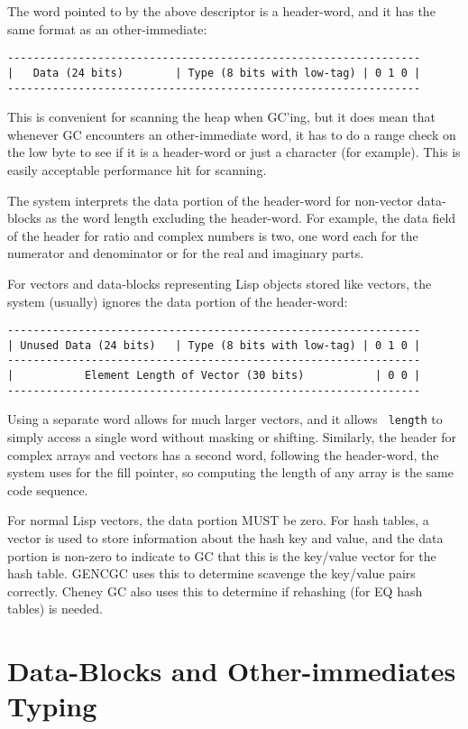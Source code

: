 The word pointed to by the above descriptor is a header-word, and it has the
same format as an other-immediate:
\begin{verbatim}
----------------------------------------------------------------
|   Data (24 bits)        | Type (8 bits with low-tag) | 0 1 0 |
----------------------------------------------------------------
\end{verbatim}
This is convenient for scanning the heap when GC'ing, but it does mean that
whenever GC encounters an other-immediate word, it has to do a range check on
the low byte to see if it is a header-word or just a character (for example).
This is easily acceptable performance hit for scanning.

The system interprets the data portion of the header-word for non-vector
data-blocks as the word length excluding the header-word.  For example, the
data field of the header for ratio and complex numbers is two, one word each
for the numerator and denominator or for the real and imaginary parts.

For vectors and data-blocks representing Lisp objects stored like vectors, the
system (usually) ignores the data portion of the header-word:
\begin{verbatim}
----------------------------------------------------------------
| Unused Data (24 bits)   | Type (8 bits with low-tag) | 0 1 0 |
----------------------------------------------------------------
|           Element Length of Vector (30 bits)           | 0 0 | 
----------------------------------------------------------------
\end{verbatim}

Using a separate word allows for much larger vectors, and it allows {\tt
length} to simply access a single word without masking or shifting.  Similarly,
the header for complex arrays and vectors has a second word, following the
header-word, the system uses for the fill pointer, so computing the length of
any array is the same code sequence.

For normal Lisp vectors, the data portion MUST be zero.  For hash
tables, a vector is used to store information about the hash key and
value, and the data portion is non-zero to indicate to GC that this is
the key/value vector for the hash table.  GENCGC uses this to
determine scavenge the key/value pairs correctly.  Cheney GC also uses
this to determine if rehashing (for EQ hash tables) is needed.


\section{Data-Blocks and Other-immediates Typing}

